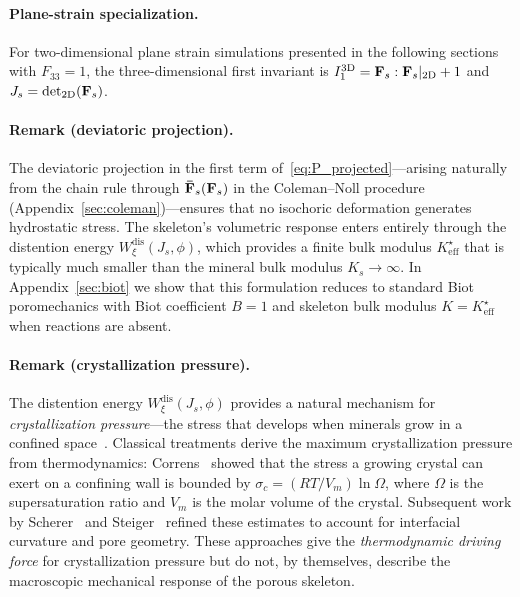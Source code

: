 \documentclass[11pt]{article}
\begin{document}
\paragraph{Plane-strain specialization.}  For two-dimensional plane strain simulations presented in the following sections with $F_{33} = 1$, the three-dimensional first invariant is $I_1^{3\text{D}} = \mathbf{F}_s:\mathbf{F}_s\vert_{2\text{D}} + 1$ and $J_s = \det_{2\text{D}}(\mathbf{F}_s)$.

\paragraph{Remark (deviatoric projection).}  The deviatoric projection in the first term of~\eqref{eq:P_projected}---arising naturally from the chain rule through $\mathbf{\bar F}_s(\mathbf{F}_s)$ in the Coleman--Noll procedure (Appendix~\ref{sec:coleman})---ensures that no isochoric deformation generates hydrostatic stress.  The skeleton's volumetric response enters entirely through the distention energy $W^{\text{dis}}_\xi(J_s, \phi)$, which provides a finite bulk modulus $K^\star_{\text{eff}}$ that is typically much smaller than the mineral bulk modulus $K_s \to \infty$.  In Appendix~\ref{sec:biot} we show that this formulation reduces to standard Biot poromechanics with Biot coefficient $B = 1$ and skeleton bulk modulus $K = K^\star_{\text{eff}}$ when reactions are absent.

\paragraph{Remark (crystallization pressure).} The distention energy $W^{\text{dis}}_\xi(J_s, \phi)$ provides a natural mechanism for \emph{crystallization pressure}---the stress that develops when minerals grow in a confined space~\cite{correns1949growth, scherer1999crystallization}.  Classical treatments derive the maximum crystallization pressure from thermodynamics: Correns~\cite{correns1949growth} showed that the stress a growing crystal can exert on a confining wall is bounded by $\sigma_c = (RT / V_m) \ln \Omega$, where $\Omega$ is the supersaturation ratio and $V_m$ is the molar volume of the crystal.  Subsequent work by Scherer~\cite{scherer1999crystallization} and Steiger~\cite{steiger2005crystal} refined these estimates to account for interfacial curvature and pore geometry.  These approaches give the \emph{thermodynamic driving force} for crystallization pressure but do not, by themselves, describe the macroscopic mechanical response of the porous skeleton.
\end{document}
